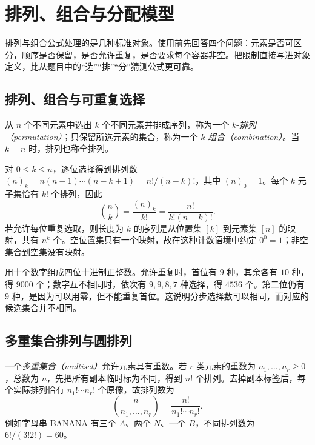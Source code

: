 \setcounter{chapter}{1} %
\chapter{排列、组合与分配模型}
\label{ch:elementary-counting}

排列与组合公式处理的是几种标准对象。使用前先回答四个问题：元素是否可区分，顺序是否保留，是否允许重复，是否要求每个容器非空。把限制直接写进对象定义，比从题目中的“选”“排”“分”猜测公式更可靠。

\section{排列、组合与可重复选择}

\begin{definition}
从 $n$ 个不同元素中选出 $k$ 个不同元素并排成序列，称为一个 $k$-\emph{排列（permutation）}；只保留所选元素的集合，称为一个 $k$-\emph{组合（combination）}。当 $k=n$ 时，排列也称全排列。
\end{definition}

对 $0\le k\le n$，逐位选择得到排列数 $(n)_k=n(n-1)\cdots(n-k+1)=n!/(n-k)!$，其中 $(n)_0=1$。每个 $k$ 元子集恰有 $k!$ 个排列，因此
\begin{equation}
  \binom nk=\frac{(n)_k}{k!}=\frac{n!}{k!(n-k)!}.
  \label{eq:binomial-count}
\end{equation}
若允许每位重复选取，则长度为 $k$ 的序列是从位置集 $[k]$ 到元素集 $[n]$ 的映射，共有 $n^k$ 个。空位置集只有一个映射，故在这种计数语境中约定 $0^0=1$；非空集合到空集没有映射。

\begin{example}
用十个数字组成四位十进制正整数。允许重复时，首位有 $9$ 种，其余各有 $10$ 种，得 $9000$ 个；数字互不相同时，依次有 $9,9,8,7$ 种选择，得 $4536$ 个。第二位仍有 $9$ 种，是因为可以用零，但不能重复首位。这说明分步选择数可以相同，而对应的候选集合并不相同。
\end{example}

\section{多重集合排列与圆排列}

一个\emph{多重集合（multiset）}允许元素具有重数。若 $r$ 类元素的重数为 $n_1,\ldots,n_r\ge0$，总数为 $n$，先把所有副本临时标为不同，得到 $n!$ 个排列。去掉副本标签后，每个实际排列恰有 $n_1!\cdots n_r!$ 个原像，故排列数为
\begin{equation}
  \binom{n}{n_1,\ldots,n_r}=\frac{n!}{n_1!\cdots n_r!}.
  \label{eq:multinomial-count}
\end{equation}
例如字母串 $\mathrm{BANANA}$ 有三个 $A$、两个 $N$、一个 $B$，不同排列数为 $6!/(3!2!)=60$。

